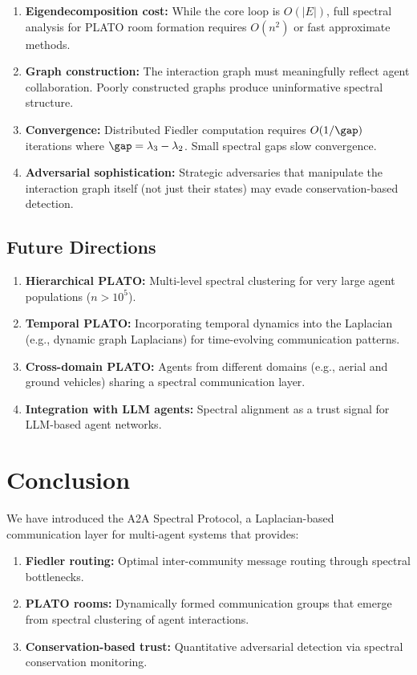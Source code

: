 \documentclass[11pt,a4paper]{article}
\begin{document}
\begin{enumerate}
  \item \textbf{Eigendecomposition cost:} While the core loop is $O(|E|)$,
        full spectral analysis for PLATO room formation requires $O(n^2)$
        or fast approximate methods.
  \item \textbf{Graph construction:} The interaction graph must meaningfully
        reflect agent collaboration.  Poorly constructed graphs produce
        uninformative spectral structure.
  \item \textbf{Convergence:} Distributed Fiedler computation requires $O(1/\gap)$
        iterations where $\gap = \lambda_3 - \lambda_2$.  Small spectral gaps
        slow convergence.
  \item \textbf{Adversarial sophistication:} Strategic adversaries that
        manipulate the interaction graph itself (not just their states) may
        evade conservation-based detection.
\end{enumerate}

\subsection{Future Directions}

\begin{enumerate}
  \item \textbf{Hierarchical PLATO:} Multi-level spectral clustering for
        very large agent populations ($n > 10^5$).
  \item \textbf{Temporal PLATO:} Incorporating temporal dynamics into the
        Laplacian (e.g., dynamic graph Laplacians) for time-evolving
        communication patterns.
  \item \textbf{Cross-domain PLATO:} Agents from different domains (e.g.,
        aerial and ground vehicles) sharing a spectral communication layer.
  \item \textbf{Integration with LLM agents:} Spectral alignment as a
        trust signal for LLM-based agent networks.
\end{enumerate}

\section{Conclusion}
\label{sec:conclusion}

We have introduced the A2A Spectral Protocol, a Laplacian-based communication
layer for multi-agent systems that provides:
\begin{enumerate}
  \item \textbf{Fiedler routing:} Optimal inter-community message routing
        through spectral bottlenecks.
  \item \textbf{PLATO rooms:} Dynamically formed communication groups that
        emerge from spectral clustering of agent interactions.
  \item \textbf{Conservation-based trust:} Quantitative adversarial detection
        via spectral conservation monitoring.
\end{enumerate}
\end{document}
